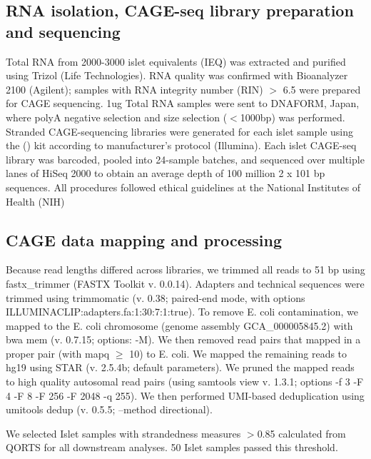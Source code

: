 \subsection{RNA isolation, CAGE-seq library preparation and sequencing}
Total RNA from 2000-3000 islet equivalents (IEQ) was extracted and purified using Trizol (Life Technologies). RNA quality was confirmed with Bioanalyzer 2100 (Agilent); samples with RNA integrity number (RIN) $>$ 6.5 were prepared for CAGE sequencing. 1ug Total RNA samples were sent to DNAFORM, Japan, where polyA negative selection and size selection ($<$1000bp) was performed. Stranded CAGE-sequencing libraries were generated for each islet sample using the () kit according to manufacturer’s protocol (Illumina). Each islet CAGE-seq library was barcoded, pooled into 24-sample batches, and sequenced over multiple lanes of HiSeq 2000 to obtain an average depth of 100 million 2 x 101 bp sequences. All procedures followed ethical guidelines at the National Institutes of Health (NIH)


\subsection{CAGE data mapping and processing}
Because read lengths differed across libraries, we trimmed all reads to 51 bp using fastx\_trimmer (FASTX Toolkit v. 0.0.14). Adapters and technical sequences were trimmed using trimmomatic (v. 0.38; paired-end mode, with options ILLUMINACLIP:adapters.fa:1:30:7:1:true). To remove E. coli contamination, we mapped to the E. coli chromosome (genome assembly GCA\_000005845.2) with bwa mem (v. 0.7.15; options: -M). We then removed read pairs that mapped in a proper pair (with mapq $\geq$ 10) to E. coli. We mapped the remaining reads to hg19 using STAR (v. 2.5.4b; default parameters). We pruned the mapped reads to high quality autosomal read pairs (using samtools view v. 1.3.1; options -f 3 -F 4 -F 8 -F 256 -F 2048 -q 255). We then performed UMI-based deduplication using umitools dedup (v. 0.5.5; --method directional).


We selected Islet samples with strandedness measures $>$0.85 calculated from QORTS for all downstream analyses. {50} Islet samples passed this threshold.



